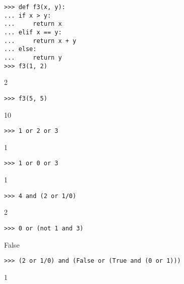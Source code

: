 \begin{lstlisting}
>>> def f3(x, y):
...	if x > y:
...		return x
...	elif x == y:
...		return x + y
...	else:
...		return y
>>> f3(1, 2)
\end{lstlisting}
\begin{solution}[.2in]
2
\end{solution}

\begin{lstlisting}
>>> f3(5, 5)
\end{lstlisting}
\begin{solution}[.2in]
10
\end{solution}

\begin{lstlisting}
>>> 1 or 2 or 3
\end{lstlisting}
\begin{solution}[.2in]
1
\end{solution}

\begin{lstlisting}
>>> 1 or 0 or 3
\end{lstlisting}
\begin{solution}[.2in]
1
\end{solution}

\begin{lstlisting}
>>> 4 and (2 or 1/0)
\end{lstlisting}
\begin{solution}[.2in]
2
\end{solution}

\begin{lstlisting}
>>> 0 or (not 1 and 3)
\end{lstlisting}
\begin{solution}[.2in]
False
\end{solution}

\begin{lstlisting}
>>> (2 or 1/0) and (False or (True and (0 or 1)))
\end{lstlisting}
\begin{solution}[.2in]
1
\end{solution}